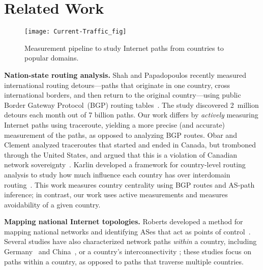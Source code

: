 \section{Related Work}
\label{related}

\begin{figure*}[t]
\centering
\texttt{[image: Current-Traffic\_fig]}
\caption{Measurement pipeline to study Internet paths from countries to
  popular domains.}
\label{fig:pipeline1}
\end{figure*}

{\bf Nation-state routing analysis.}  Shah and
Papadopoulos recently measured international routing detours---paths that originate
in
one country, cross international borders, and then return to the
original country---using public Border Gateway Protocol~(BGP) routing tables~\cite
{shah2015characterizing}. 
The study discovered 2~million detours each month out
of 7 billion paths.
Our work differs by {\em actively}
measuring Internet paths using traceroute, yielding a more precise (and accurate) measurement of the paths, %
as opposed to analyzing BGP
routes.  Obar and Clement analyzed traceroutes
that started and ended in Canada, but tromboned through the United
States, and argued that
this is a violation of Canadian network
sovereignty~\cite{obar2012internet}. 
Karlin \ea{} developed a framework for country-level
routing analysis to study how much influence each country has over
interdomain routing~\cite{karlin2009nation}.  This work measures country
centrality using BGP routes and AS-path inference; in contrast, our work uses active 
measurements and measures avoidability of a given country. 

{\bf Mapping national Internet topologies.}  Roberts \ea{} developed a method
for mapping national networks and identifying ASes that act as points of
control~\cite{roberts2011mapping}.   %
 Several studies have also characterized network paths {\em
within} a country, including
Germany~\cite{wahlisch2010framework,wahlisch2012exposing} and
China~\cite{zhou2007chinese}, or a country's interconnectivity %
\cite{bischof2015and,gupta2014peering,fanou2015diversity}; these studies
focus on paths within a country, as opposed to paths that traverse multiple countries.

